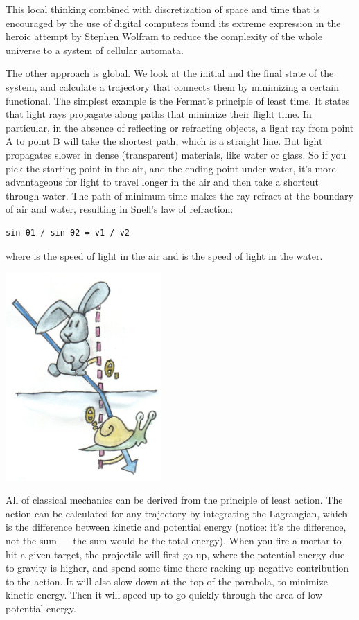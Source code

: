 This local thinking combined with discretization of space and time that
is encouraged by the use of digital computers found its extreme
expression in the heroic attempt by Stephen Wolfram to reduce the
complexity of the whole universe to a system of cellular automata.

The other approach is global. We look at the initial and the final state
of the system, and calculate a trajectory that connects them by
minimizing a certain functional. The simplest example is the Fermat's
principle of least time. It states that light rays propagate along paths
that minimize their flight time. In particular, in the absence of
reflecting or refracting objects, a light ray from point A to point B
will take the shortest path, which is a straight line. But light
propagates slower in dense (transparent) materials, like water or glass.
So if you pick the starting point in the air, and the ending point under
water, it's more advantageous for light to travel longer in the air and
then take a shortcut through water. The path of minimum time makes the
ray refract at the boundary of air and water, resulting in Snell's law
of refraction:

\begin{verbatim}
sin θ1 / sin θ2 = v1 / v2
\end{verbatim}

where  is the speed of light in the air and  is
the speed of light in the water.

\includegraphics[width=2.33333in]{images/snell.jpg}

All of classical mechanics can be derived from the principle of least
action. The action can be calculated for any trajectory by integrating
the Lagrangian, which is the difference between kinetic and potential
energy (notice: it's the difference, not the sum --- the sum would be
the total energy). When you fire a mortar to hit a given target, the
projectile will first go up, where the potential energy due to gravity
is higher, and spend some time there racking up negative contribution to
the action. It will also slow down at the top of the parabola, to
minimize kinetic energy. Then it will speed up to go quickly through the
area of low potential energy.


